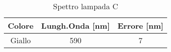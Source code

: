 \begin{table}[H]
    \begin{center}
    \caption{Spettro lampada C}
    \begin{tabular}{|c|c|c|}
        \hline
        Colore & Lungh.Onda [nm] & Errore [nm]\\ 
        \hline
        Giallo & 590 & 7 \\ 
        \hline
    \end{tabular}
    \end{center}
    \label{table:O3_P2-2_sodio}
\end{table}

